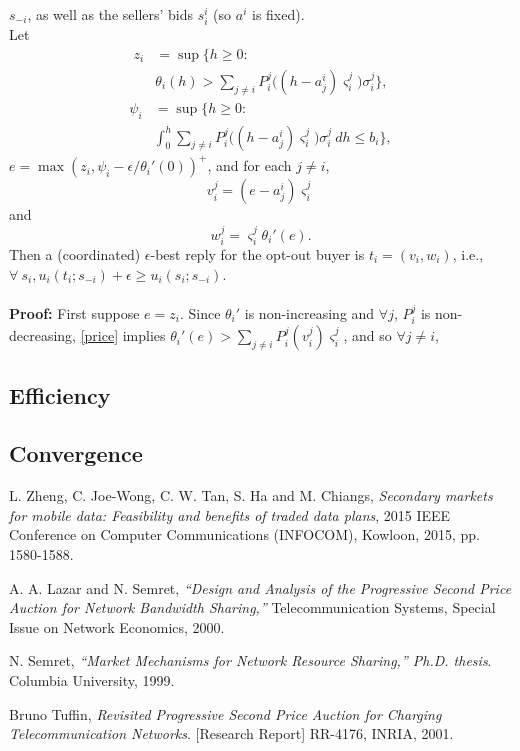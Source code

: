 \documentclass[12pt]{article}
\theoremstyle{definition}
\newcommand{\vs}{\varsigma}
\begin{document}
\begin{multicols}{2}
{$s_{-i}$, as well as the sellers' bids $s_i^i$ (so $a^i$ is fixed). \\
Let 
\begin{align}
    z_i &= \sup\bigg\lbrace h\ge 0 : \\
& \theta_i(h) > \displaystyle\sum_{j\ne i}
P_i^j\big((h-a_j^i)\vs_i^j\big)\sigma_i^j\bigg\rbrace, 
\end{align}
\begin{align}\label{price}
    \psi_i &= \sup\bigg\lbrace h\ge 0: \\
&\displaystyle\int_0^h \displaystyle\sum_{j\ne i}
P_i^j\big((h-a_j^i)\vs_i^j\big)\sigma_i^j \ dh \le b_i\bigg\rbrace,
\end{align}
$e = \max(z_i, \psi_i - \epsilon / \theta_i'(0))^+$, and for each $j\ne i$, 
$$
    v_i^j = (e - a_j^i)\vs_i^j
$$
and 
$$
    w_i^j = \vs_i^j\theta_i'(e).
$$
Then a (coordinated) $\epsilon$-best reply for the opt-out buyer is $t_i =
(v_i,w_i)$, i.e., $\forall \ s_i, u_i(t_i;s_{-i}) + \epsilon \ge u_i(s_i;
s_{-i})$.
} \\ \\
\textbf{Proof:} First suppose $e = z_i$. Since $\theta_i'$ is non-increasing
and $\forall j$, $P_i^j$ is non-decreasing, \ref{price} implies $\theta_i'(e) >
\sum_{j\ne i} P_i^j(v_i^j)\vs_i^j$, and so $\forall j\ne i$, 

\subsection{Efficiency}

\subsection{Convergence}

\end{multicols}

\begin{thebibliography}{9}

L. Zheng, C. Joe-Wong, C. W. Tan, S. Ha and M. Chiangs, 
\textit{Secondary markets for mobile data: Feasibility and benefits of traded
data plans}, 2015 IEEE
Conference on Computer Communications (INFOCOM), Kowloon, 2015, pp. 1580-1588.

A. A. Lazar and N. Semret, 
\textit{“Design and Analysis of the Progressive Second Price Auction for Network
Bandwidth Sharing,”} Telecommunication Systems, Special Issue on Network Economics, 2000.

N. Semret, 
\textit{“Market Mechanisms for Network Resource Sharing,”
Ph.D. thesis}. 
Columbia University, 1999.

Bruno Tuffin,
\textit{Revisited Progressive Second Price Auction for Charging
Telecommunication Networks}.
[Research Report] RR-4176, INRIA, 2001.
 
\end{thebibliography}
\end{document}
